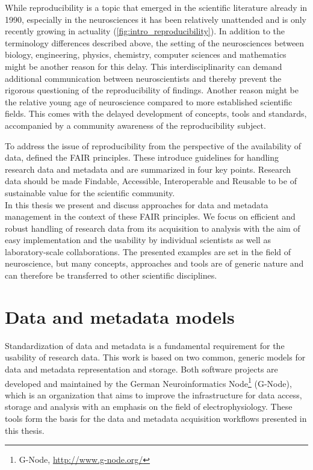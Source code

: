 While reproducibility is a topic that emerged in the scientific literature already in 1990, especially in the neurosciences it has been relatively unattended and is only recently growing in actuality (\cref{fig:intro_reproducibility}). In addition to the terminology differences described above, the setting of the neurosciences between biology, engineering, physics, chemistry, computer sciences and mathematics might be another reason for this delay. This interdisciplinarity can demand additional communication between neuroscientists and thereby prevent the rigorous questioning of the reproducibility of findings. Another reason might be the relative young age of neuroscience compared to more established scientific fields. This comes with the delayed development of concepts, tools and standards, accompanied by a community awareness of the reproducibility subject.

To address the issue of reproducibility from the perspective of the availability of data, \citet{Wilkinson_2016} defined the FAIR principles. These introduce guidelines for handling research data and metadata and are summarized in four key points. Research data should be made Findable, Accessible, Interoperable and Reusable to be of sustainable value for the scientific community.\\

In this thesis we present and discuss approaches for data and metadata management in the context of these FAIR principles. We focus on efficient and robust handling of research data from its acquisition to analysis with the aim of easy implementation and the usability by individual scientists as well as laboratory-scale collaborations. The presented examples are set in the field of neuroscience, but many concepts, approaches and tools are of generic nature and can therefore be transferred to other scientific disciplines. 



\section{Data and metadata models}
Standardization of data and metadata is a fundamental requirement for the usability of research data. This work is based on two common, generic models for data and metadata representation and storage. Both software projects are developed and maintained by the German Neuroinformatics Node\footnote{G-Node, \url{http://www.g-node.org/}} (G-Node), which is an organization that aims to improve the infrastructure for data access, storage and analysis with an emphasis on the field of electrophysiology. These tools form the basis for the data and metadata acquisition workflows presented in this thesis.

